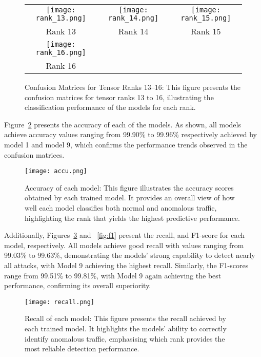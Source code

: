 \documentclass[preprint,12pt,authoryear]{elsarticle}
\begin{document}
\begin{figure}[H]
    \centering
    \begin{tabular}{ccc}
        \texttt{[image: rank\_13.png]} &
        \texttt{[image: rank\_14.png]} &
        \texttt{[image: rank\_15.png]} \\
        \small Rank 13 & \small Rank 14 & \small Rank 15 \\[6pt]

        \texttt{[image: rank\_16.png]} & & \\
        \small Rank 16 & & 
    \end{tabular}
    \caption{Confusion Matrices for Tensor Ranks 13–16: This figure presents the confusion matrices for tensor ranks 13 to 16, illustrating the classification performance of the models for each rank.}
    \label{fig:confusion_matrices_3}
\end{figure}


 Figure~\ref{fig:accl} presents the accuracy of each of the models. As shown, all models achieve accuracy values ranging from 99.90\% to 99.96\% respectively achieved by model 1 and model 9, which confirms the performance trends observed in the confusion matrices.
\begin{figure}[H]
    \centering
    \texttt{[image: accu.png]}
    \caption{Accuracy of each model: This figure illustrates the accuracy scores obtained by each trained model. It provides an overall view of how well each model classifies both normal and anomalous traffic, highlighting the rank that yields the highest predictive performance.}
    \label{fig:accl}
\end{figure}
\noindent Additionally, Figures~\ref{fig:recall} and ~\ref{fig:f1} present the recall, and F1-score for each model, respectively. All models achieve good recall with values ranging from 99.03\% to 99.63\%, demonstrating the models’ strong capability to detect nearly all attacks, with Model 9 achieving the highest recall. Similarly, the F1-scores range from 99.51\% to 99.81\%, with Model 9 again achieving the best performance, confirming its overall superiority.

\begin{figure}[H]
    \centering
    \texttt{[image: recall.png]}
    \caption{Recall of each model: This figure presents the recall achieved by each trained model. It highlights the models’ ability to correctly identify anomalous traffic, emphasising which rank provides the most reliable detection performance.}
    \label{fig:recall}
\end{figure}
\end{document}
